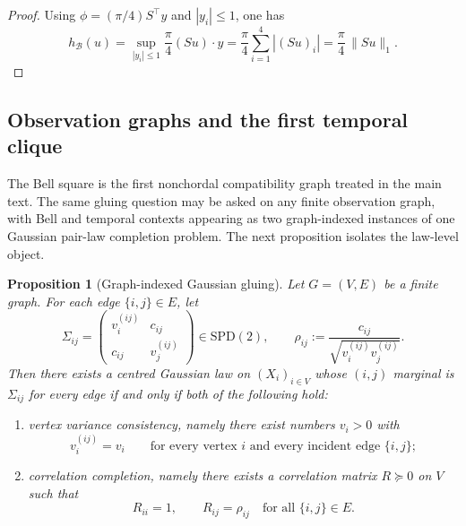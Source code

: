 \documentclass[11pt]{article}
\numberwithin{equation}{section}
\newcommand{\SPD}{\mathrm{SPD}}
\theoremstyle{thmcompact}
\newtheorem{proposition}[theorem]{Proposition}
\theoremstyle{remark}
\begin{document}
\begin{proof}
Using $\phi=(\pi/4)S^\top y$ and $|y_i|\le 1$, one has
\[
h_{\mathcal B}(u)=\sup_{|y_i|\le 1}\frac{\pi}{4}(Su)\cdot y
=\frac{\pi}{4}\sum_{i=1}^4 |(Su)_i|
=\frac{\pi}{4}\,\|Su\|_1.
\]
\end{proof}

\subsection{Observation graphs and the first temporal clique}

The Bell square is the first nonchordal compatibility graph treated in the main text. The same gluing question may be asked on any finite observation graph, with Bell and temporal contexts appearing as two graph-indexed instances of one Gaussian pair-law completion problem. The next proposition isolates the law-level object.

\begin{proposition}[Graph-indexed Gaussian gluing]\label{prop:graph-gluing}
Let $G=(V,E)$ be a finite graph. For each edge $\{i,j\}\in E$, let
\[
\Sigma_{ij}=\begin{pmatrix} v_i^{(ij)} & c_{ij}\\ c_{ij} & v_j^{(ij)}\end{pmatrix}\in\SPD(2),
\qquad
\rho_{ij}:=\frac{c_{ij}}{\sqrt{v_i^{(ij)}v_j^{(ij)}}}.
\]
Then there exists a centred Gaussian law on $(X_i)_{i\in V}$ whose $(i,j)$ marginal is $\Sigma_{ij}$ for every edge if and only if both of the following hold:
\begin{enumerate}[label=\textup{(\roman*)},leftmargin=2.3em]
\item vertex variance consistency, namely there exist numbers $v_i>0$ with
\[
v_i^{(ij)}=v_i
\qquad
\text{for every vertex $i$ and every incident edge $\{i,j\}$};
\]
\item correlation completion, namely there exists a correlation matrix $R\succeq0$ on $V$ such that
\[
R_{ii}=1,
\qquad
R_{ij}=\rho_{ij}
\quad
\text{for all }\{i,j\}\in E.
\]
\end{enumerate}
\end{proposition}
\end{document}
